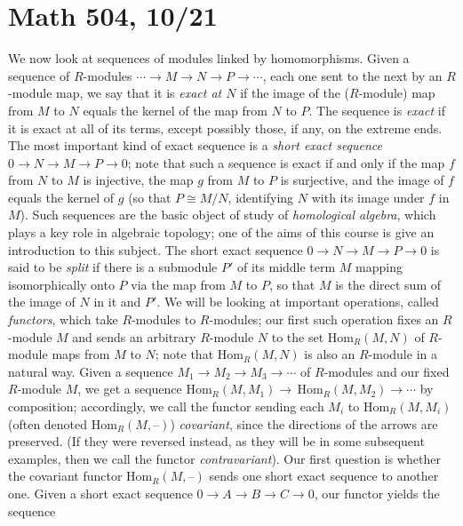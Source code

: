 \documentclass[10pt]{article}
\begin{document}
\section*{Math 504, 10/21}

We now look at sequences of modules linked by homomorphisms. Given a
sequence of $R$-modules $\cdots\rightarrow M\rightarrow N\rightarrow
P\rightarrow\cdots$, each one sent to the next by an $R$-module map, we
say that it is {\sl exact at $N$} if the image of the ($R$-module) map
from $M$ to $N$ equals the kernel of the map from $N$ to $P$. The
sequence is {\sl exact} if it is exact at all of its terms, except
possibly those, if any, on the extreme ends. The most important kind of
exact sequence is a {\sl short exact sequence} $0\rightarrow
N\rightarrow M\rightarrow P\rightarrow 0$; note that such a sequence is
exact if and only if the map $f$ from $N$ to $M$ is injective, the map
$g$ from $M$ to $P$ is surjective, and the image of $f$ equals the
kernel of $g$ (so that $P\cong M/N$, identifying $N$ with its image
under $f$ in $M$). Such sequences are the basic object of study of {\sl
  homological algebra}, which plays a key role in algebraic topology;
one of the aims of this course is give an introduction to this subject.
The short exact sequence $0\rightarrow N\rightarrow M\rightarrow
P\rightarrow 0$ is said to be {\sl split} if there is a submodule $P'$
of its middle term $M$ mapping isomorphically onto $P$ via the map from
$M$ to $P$, so that $M$ is the direct sum of the image of $N$ in it and
$P'$. We will be looking at important operations, called {\sl functors},
which take $R$-modules to $R$-modules; our first such operation fixes an
$R$-module $M$ and sends an arbitrary $R$-module $N$ to the set
Hom$_R(M,N)$ of $R$-module maps from $M$ to $N$; note that Hom$_R(M,N)$
is also an $R$-module in a natural way. Given a sequence $M_1\rightarrow
M_2\rightarrow M_3\rightarrow\cdots$ of $R$-modules and our fixed
$R$-module $M$, we get a sequence
Hom$_R(M,M_1)\rightarrow\,$Hom$_R(M,M_2)\rightarrow\cdots$ by
composition; accordingly, we call the functor sending each $M_i$ to
Hom$_R(M,M_i)$ (often denoted Hom$_R(M,\text{--})$) {\sl covariant},
since the directions of the arrows are preserved. (If they were reversed
instead, as they will be in some subsequent examples, then we call the
functor {\sl contravariant}). Our first question is whether the
covariant functor Hom$_R(M,\text{--})$ sends one short exact sequence to
another one. Given a short exact sequence $0\rightarrow A\rightarrow
B\rightarrow C\rightarrow 0$, our functor yields the sequence
\end{document}
